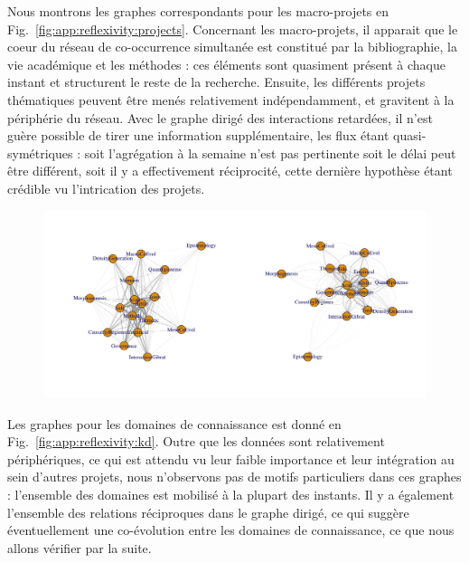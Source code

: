 


Nous montrons les graphes correspondants pour les macro-projets en Fig.~\ref{fig:app:reflexivity:projects}. Concernant les macro-projets, il apparait que le coeur du réseau de co-occurrence simultanée est constitué par la bibliographie, la vie académique et les méthodes : ces éléments sont quasiment présent à chaque instant et structurent le reste de la recherche. Ensuite, les différents projets thématiques peuvent être menés relativement indépendamment, et gravitent à la périphérie du réseau. Avec le graphe dirigé des interactions retardées, il n'est guère possible de tirer une information supplémentaire, les flux étant quasi-symétriques : soit l'agrégation à la semaine n'est pas pertinente soit le délai peut être différent, soit il y a effectivement réciprocité, cette dernière hypothèse étant crédible vu l'intrication des projets.


\begin{figure}
	\includegraphics[width=\linewidth]{Figures/Final/F-reflexivity-projects.jpg}
\end{figure}


Les graphes pour les domaines de connaissance est donné en Fig.~\ref{fig:app:reflexivity:kd}. Outre que les données sont relativement périphériques, ce qui est attendu vu leur faible importance et leur intégration au sein d'autres projets, nous n'observons pas de motifs particuliers dans ces graphes : l'ensemble des domaines est mobilisé à la plupart des instants. Il y a également l'ensemble des relations réciproques dans le graphe dirigé, ce qui suggère éventuellement une co-évolution entre les domaines de connaissance, ce que nous allons vérifier par la suite.

